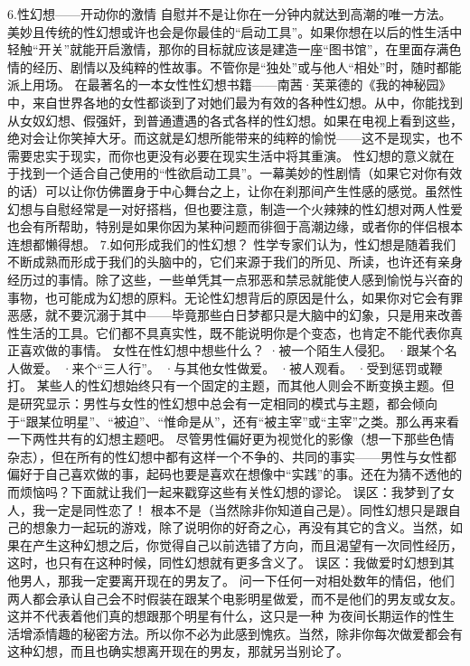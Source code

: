 \documentclass[12pt,UTF8]{ctexbook}
\begin{document}
6.性幻想——开动你的激情
自慰并不是让你在一分钟内就达到高潮的唯一方法。美妙且传统的性幻想或许也会是你最佳的“启动工具”。如果你想在以后的性生活中轻触“开关”就能开启激情，那你的目标就应该是建造一座“图书馆”，在里面存满色情的经历、剧情以及纯粹的性故事。不管你是“独处”或与他人“相处”时，随时都能派上用场。
在最著名的一本女性性幻想书籍——南茜·芙莱德的《我的神秘园》中，来自世界各地的女性都谈到了对她们最为有效的各种性幻想。从中，你能找到从女奴幻想、假强奸，到普通遭遇的各式各样的性幻想。如果在电视上看到这些，绝对会让你笑掉大牙。而这就是幻想所能带来的纯粹的愉悦——这不是现实，也不需要忠实于现实，而你也更没有必要在现实生活中将其重演。
性幻想的意义就在于找到一个适合自己使用的“性欲启动工具”。一幕美妙的性剧情（如果它对你有效的话）可以让你仿佛置身于中心舞台之上，让你在刹那间产生性感的感觉。虽然性幻想与自慰经常是一对好搭档，但也要注意，制造一个火辣辣的性幻想对两人性爱也会有所帮助，特别是如果你因为某种问题而徘徊于高潮边缘，或者你的伴侣根本连想都懒得想。
7.如何形成我们的性幻想？
性学专家们认为，性幻想是随着我们不断成熟而形成于我们的头脑中的，它们来源于我们的所见、所读，也许还有亲身经历过的事情。除了这些，一些单凭其一点邪恶和禁忌就能使人感到愉悦与兴奋的事物，也可能成为幻想的原料。无论性幻想背后的原因是什么，如果你对它会有罪恶感，就不要沉溺于其中——毕竟那些白日梦都只是大脑中的幻象，只是用来改善性生活的工具。它们都不具真实性，既不能说明你是个变态，也肯定不能代表你真正喜欢做的事情。
女性在性幻想中想些什么？
·被一个陌生人侵犯。
·跟某个名人做爱。
·来个“三人行”。
·与其他女性做爱。
·被人观看。
·受到惩罚或鞭打。
某些人的性幻想始终只有一个固定的主题，而其他人则会不断变换主题。但是研究显示：男性与女性的性幻想中总会有一定相同的模式与主题，都会倾向于“跟某位明星”、“被迫”、“惟命是从”，还有“被主宰”或“主宰”之类。那么再来看一下两性共有的幻想主题吧。
尽管男性偏好更为视觉化的影像（想一下那些色情杂志），但在所有的性幻想中都有这样一个不争的、共同的事实——男性与女性都偏好于自己喜欢做的事，起码也要是喜欢在想像中“实践”的事。还在为猜不透他的而烦恼吗？下面就让我们一起来戳穿这些有关性幻想的谬论。
误区：我梦到了女人，我一定是同性恋了！
根本不是（当然除非你知道自己是）。同性幻想只是跟自己的想象力一起玩的游戏，除了说明你的好奇之心，再没有其它的含义。当然，如果在产生这种幻想之后，你觉得自己以前选错了方向，而且渴望有一次同性经历，这时，也只有在这种时候，同性幻想就有更多含义了。
误区：我做爱时幻想到其他男人，那我一定要离开现在的男友了。
问一下任何一对相处数年的情侣，他们两人都会承认自己会不时假装在跟某个电影明星做爱，而不是他们的男友或女友。这并不代表着他们真的想跟那个明星有什么，这只是一种
为夜间长期运作的性生活增添情趣的秘密方法。所以你不必为此感到愧疚。当然，除非你每次做爱都会有这种幻想，而且也确实想离开现在的男友，那就另当别论了。
\end{document}
